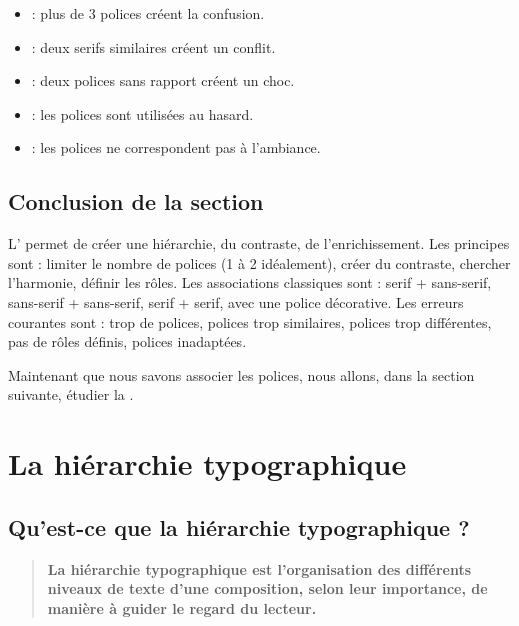 \begin{itemize}
    \item {} : plus de 3 polices créent la confusion.
    \item {} : deux serifs similaires créent un conflit.
    \item {} : deux polices sans rapport créent un choc.
    \item {} : les polices sont utilisées au hasard.
    \item {} : les polices ne correspondent pas à l'ambiance.
\end{itemize}

\subsection*{Conclusion de la section}

\begin{retenir}
L' permet de créer une hiérarchie, du contraste, de l'enrichissement. Les principes sont : limiter le nombre de polices (1 à 2 idéalement), créer du contraste, chercher l'harmonie, définir les rôles. Les associations classiques sont : serif + sans-serif, sans-serif + sans-serif, serif + serif, avec une police décorative. Les erreurs courantes sont : trop de polices, polices trop similaires, polices trop différentes, pas de rôles définis, polices inadaptées.
\end{retenir}

Maintenant que nous savons associer les polices, nous allons, dans la section suivante, étudier la .

\section{La hiérarchie typographique}

\subsection{Qu'est-ce que la hiérarchie typographique ?}

\begin{quote}
\textbf{La hiérarchie typographique est l'organisation des différents niveaux de texte d'une composition, selon leur importance, de manière à guider le regard du lecteur.}
\end{quote}

